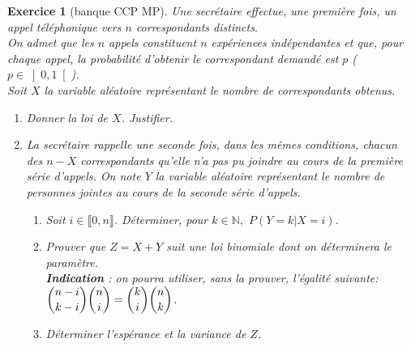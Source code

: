 \documentclass[12pt,a4paper,landscape]{article}
\newtheorem{Exo}{Exercice}
\begin{document}
\begin{Exo}[banque CCP MP]
	Une secrétaire effectue, une première fois, un appel téléphonique vers $n$ correspondants distincts.\\
On admet que les $n$ appels constituent $n$ expériences indépendantes et que, pour chaque appel, la probabilité d'obtenir le correspondant demandé est $p$ ($p\in{\left]  0,1\right[ }$).\\
Soit $X$ la variable aléatoire représentant le nombre de correspondants obtenus.
\begin{enumerate}
	\item Donner la loi de $X$. Justifier.
	\item
	La secrétaire rappelle une seconde fois, dans les mêmes conditions, chacun des $n-X$ correspondants qu'elle n'a pas pu joindre au cours de la première série d'appels.
	On note $Y$ la variable aléatoire représentant le nombre de personnes jointes au cours de la seconde série d'appels.
	\begin{enumerate}
		\item
		Soit $i\in \llbracket 0,n \rrbracket $.
		Déterminer, pour  $k\in \mathbb{N}, $ $P(Y=k|X=i)$.
		\item
		Prouver que $Z=X+Y$ suit une loi binomiale dont on déterminera le paramètre.\\
		\textbf{Indication} : on pourra utiliser, sans la prouver, l'égalité suivante: $\dbinom{n-i}{k-i}\dbinom{n}{i}=\dbinom{k}{i}\dbinom{n}{k}$.\\
		\item
		Déterminer l'espérance et la variance de $Z$.
	\end{enumerate}
\end{enumerate}

\end{Exo}
\end{document}
